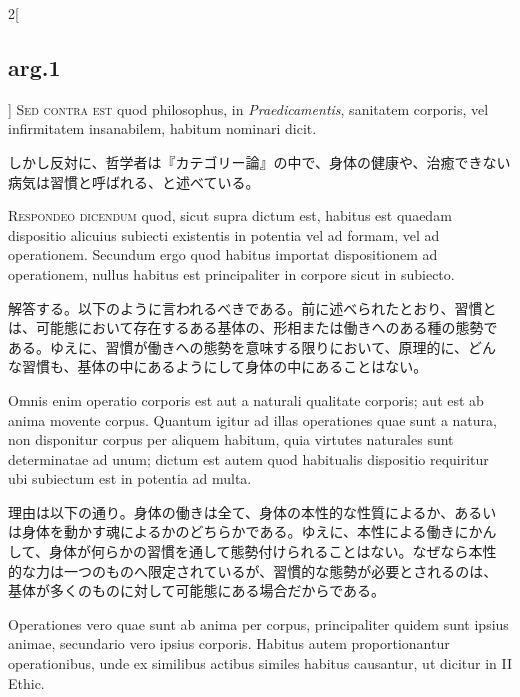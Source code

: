 \documentclass[paper=a4paper,fontsize=10pt,jafontsize=9pt,titlepage]{jlreq}
\begin{document}
\begin{paracol}{2}[\subsection{arg.1}]
{\scshape Sed contra est} quod philosophus, in {\itshape
Praedicamentis}, sanitatem corporis, vel infirmitatem insanabilem,
habitum nominari dicit.

\switchcolumn

しかし反対に、哲学者は『カテゴリー論』の中で、身体の健康や、治癒できない病気は習慣と呼ばれる、と述べている。


{\scshape Respondeo dicendum} quod, sicut supra dictum est, habitus est quaedam
dispositio alicuius subiecti existentis in potentia vel ad formam, vel
ad operationem. Secundum ergo quod habitus importat dispositionem ad
operationem, nullus habitus est principaliter in corpore sicut in
subiecto.

\switchcolumn

解答する。以下のように言われるべきである。前に述べられたとおり、習慣と
は、可能態において存在するある基体の、形相または働きへのある種の態勢で
ある。ゆえに、習慣が働きへの態勢を意味する限りにおいて、原理的に、どん
な習慣も、基体の中にあるようにして身体の中にあることはない。

\switchcolumn*

Omnis enim operatio corporis est aut a naturali qualitate
corporis; aut est ab anima movente corpus. Quantum igitur ad illas
operationes quae sunt a natura, non disponitur corpus per aliquem
habitum, quia virtutes naturales sunt determinatae ad unum; dictum est
autem quod habitualis dispositio requiritur ubi subiectum est in
potentia ad multa.

\switchcolumn

理由は以下の通り。身体の働きは全て、身体の本性的な性質によるか、あるい
は身体を動かす魂によるかのどちらかである。ゆえに、本性による働きにかん
して、身体が何らかの習慣を通して態勢付けられることはない。なぜなら本性
的な力は一つのものへ限定されているが、習慣的な態勢が必要とされるのは、
基体が多くのものに対して可能態にある場合だからである。

\switchcolumn*

Operationes vero quae sunt ab anima per corpus,
principaliter quidem sunt ipsius animae, secundario vero ipsius
corporis. Habitus autem proportionantur operationibus, unde ex
similibus actibus similes habitus causantur, ut dicitur in II
Ethic.

\switchcolumn


\end{paracol}
\end{document}
